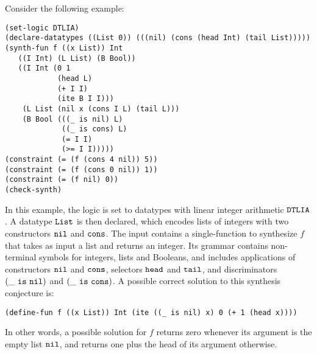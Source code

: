\documentclass[english,a4paper,10pt]{article}
\begin{document}
\begin{example}
Consider the following example:
\begin{lstlisting}[basicstyle={\ttfamily}]
(set-logic DTLIA)
(declare-datatypes ((List 0)) (((nil) (cons (head Int) (tail List)))))
(synth-fun f ((x List)) Int
   ((I Int) (L List) (B Bool))
   ((I Int (0 1 
            (head L) 
            (+ I I)
            (ite B I I)))
    (L List (nil x (cons I L) (tail L)))
    (B Bool (((_ is nil) L) 
             ((_ is cons) L)
             (= I I)
             (>= I I)))))
(constraint (= (f (cons 4 nil)) 5))
(constraint (= (f (cons 0 nil)) 1))
(constraint (= (f nil) 0))
(check-synth)
\end{lstlisting}
In this example, the logic is set to 
datatypes with linear integer arithmetic ${\tt DTLIA}$.
A datatype ${\tt List}$ is then declared,
which encodes lists of integers with two constructors ${\tt nil}$ and ${\tt cons}$.
The input contains a single-function to synthesize $f$
that takes as input a list and returns an integer.
Its grammar contains non-terminal symbols for integers, lists and Booleans,
and includes applications of constructors ${\tt nil}$ and ${\tt cons}$,
selectors ${\tt head}$ and ${\tt tail}$, and
discriminators ${\tt (\_\ is\ nil)}$ and ${\tt (\_\ is\ cons)}$.
A possible correct solution to this synthesis conjecture is:
\begin{lstlisting}[basicstyle={\ttfamily}]
(define-fun f ((x List)) Int (ite ((_ is nil) x) 0 (+ 1 (head x))))
\end{lstlisting}
In other words, a possible solution for $f$ returns zero whenever its
argument is the empty list ${\tt nil}$, 
and returns one plus the head of its argument otherwise.
\end{example}
\end{document}

